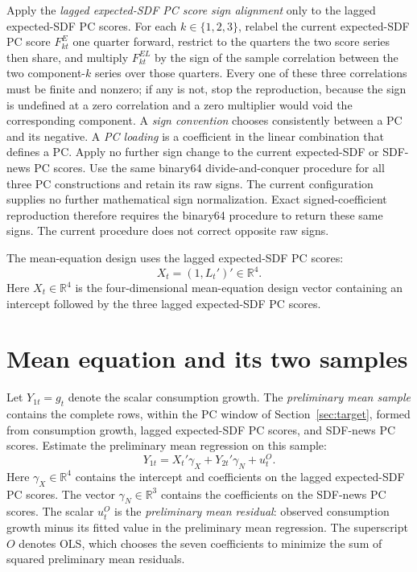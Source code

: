 \documentclass[11pt]{article}
\begin{document}
Apply the \emph{lagged expected-SDF PC score sign alignment}
only to the lagged expected-SDF PC scores. For each \(k\in\{1,2,3\}\), relabel the current
expected-SDF PC score \(F^E_{kt}\) one quarter forward, restrict to the quarters the two score series
then share, and multiply \(F^{EL}_{kt}\) by the sign of the sample correlation between the two
component-\(k\) series over those quarters. Every one of these three correlations must be
finite and nonzero; if any is not, stop the reproduction, because the sign is undefined at a zero
correlation and a zero multiplier would void the corresponding component.
A \emph{sign convention} chooses consistently between a PC and its negative. A
\emph{PC loading} is a coefficient in the linear combination that defines a PC\@. Apply no further
sign change to the current expected-SDF or SDF-news PC scores. Use the same binary64
divide-and-conquer procedure for all three PC constructions and retain its raw signs. The current
configuration supplies no further mathematical sign normalization. Exact signed-coefficient
reproduction therefore requires the binary64 procedure to return these same signs. The current
procedure does not correct opposite raw signs.

The mean-equation design uses the lagged expected-SDF PC scores:
\begin{equation*}
 X_t=(1,L_t')'\in\mathbb R^4.
\end{equation*}
Here \(X_t\in\mathbb R^4\) is the four-dimensional mean-equation design vector containing an
intercept followed by the three lagged expected-SDF PC scores.

\section{Mean equation and its two samples}
\label{sec:meaneq}

Let \(Y_{1t}=g_t\) denote the scalar consumption growth. The \emph{preliminary mean sample}
contains the complete rows, within the PC window of Section~\ref{sec:target}, formed from
consumption growth, lagged expected-SDF PC scores, and
SDF-news PC scores. Estimate the preliminary mean regression on this sample:
\begin{equation}
 Y_{1t}=X_t'\gamma_X+Y_{2t}'\gamma_N+u_t^{O}.
 \label{eq:prelim-ols}
\end{equation}
Here \(\gamma_X\in\mathbb R^4\) contains the intercept and coefficients on the lagged expected-SDF
PC scores. The vector \(\gamma_N\in\mathbb R^3\) contains the coefficients on the SDF-news PC
scores. The scalar \(u_t^{O}\) is the \emph{preliminary mean residual}: observed consumption growth
minus its fitted value in the preliminary mean regression. The superscript \(O\) denotes OLS, which
chooses the seven coefficients to minimize the sum of squared preliminary mean residuals.
\end{document}
